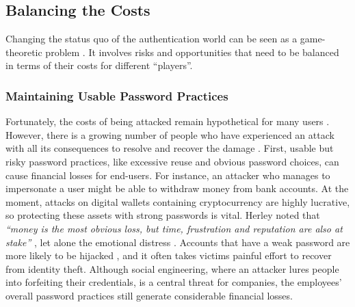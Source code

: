 \subsection{Balancing the Costs}
Changing the status quo of the authentication world can be seen as a game-theoretic problem \cite{Bonneau2015ImperfectAuthentication}. It involves risks and opportunities that need to be balanced in terms of their costs for different ``players''. 

\subsubsection{Maintaining Usable Password Practices}
Fortunately, the costs of being attacked remain hypothetical for many users \cite{Herley2015Counterfactuals}. However, there is a growing number of people who have experienced an attack with all its consequences to resolve and recover the damage \cite{BKA2016Bundeslagebild}. 
First, usable but risky password practices, like excessive reuse and obvious password choices, can cause financial losses for end-users. For instance, an attacker who manages to impersonate a user might be able to withdraw money from bank accounts. At the moment, attacks on digital wallets containing cryptocurrency are highly lucrative, so protecting these assets with strong passwords is vital. 
Herley \etal noted that \textit{``money is the most obvious loss, but time, frustration and reputation are also at stake''} \cite{Herley2012PersistenceOfPasswords}, let alone the emotional distress \cite{Shay2014ReligiousAunt}. Accounts that have a weak password are more likely to be hijacked \cite{Wang2016TargetedGuessingUnderestimated}, and it often takes victims painful effort to recover from identity theft. Although social engineering, where an attacker lures people into forfeiting their credentials, is a central threat for companies, the employees' overall password practices still generate considerable financial losses. 

